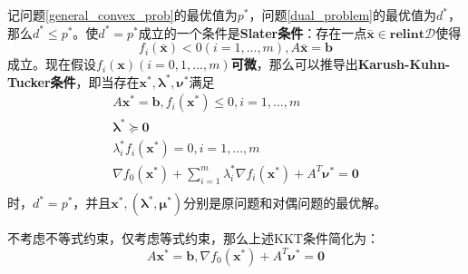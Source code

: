 \documentclass{article}
\begin{document}
记问题\ref{general_convex_prob}的最优值为$p^*$，问题\ref{dual_problem}的最优值为$d^*$，
那么$d^*\le p^*$。使$d^*=p^*$成立的一个条件是\textbf{Slater条件}：存在一点$\bar{\bm x}\in \textbf{relint}\mathcal D$使得
$$f_i(\bar{\bm x})<0(i=1,...,m),A\bar{\bm x}=\bm b$$
成立。现在假设$f_i(\bm x)(i=0,1,...,m)$\textbf{可微}，那么可以推导出\textbf{Karush-Kuhn-Tucker条件}，即当存在$\bm x^*,\bm\lambda^*,\bm\nu^*$满足
\begin{equation}
    \label{kkt}
    \begin{gathered}
    A\bm x^*=\bm b,f_i(\bm x^*)\le 0,i=1,...,m \\
    \bm\lambda^*\succeq \bm 0 \\
    \lambda^*_if_i(\bm x^*)=0,i=1,...,m\\
    \nabla f_0(\bm x^*)+\sum_{i=1}^m{\lambda^*_i}\nabla f_i(\bm x^*)+A^T\bm\nu^*=\bm 0\\
    \end{gathered}
\end{equation}
时，$d^*=p^*$，并且$\bm x^*,(\bm\lambda^*,\bm\mu^*)$分别是原问题和对偶问题的最优解。

不考虑不等式约束，仅考虑等式约束，那么上述KKT条件简化为：
\begin{equation}
    A\bm x^*=\bm b,\nabla f_0(\bm x^*)+A^T\bm\nu ^*=\bm 0\label{equation_constraint_kkt}
\end{equation}
\end{document}

